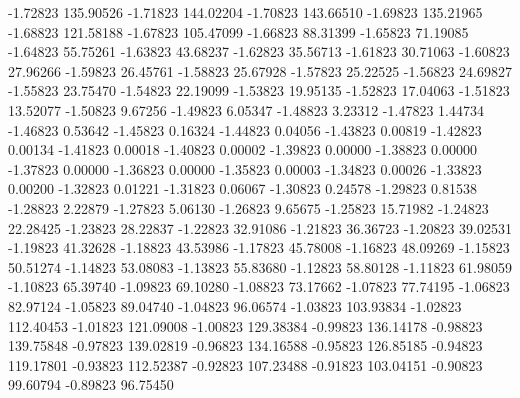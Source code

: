      -1.72823    135.90526    
     -1.71823    144.02204    
     -1.70823    143.66510    
     -1.69823    135.21965    
     -1.68823    121.58188    
     -1.67823    105.47099    
     -1.66823     88.31399    
     -1.65823     71.19085    
     -1.64823     55.75261    
     -1.63823     43.68237    
     -1.62823     35.56713    
     -1.61823     30.71063    
     -1.60823     27.96266    
     -1.59823     26.45761    
     -1.58823     25.67928    
     -1.57823     25.22525    
     -1.56823     24.69827    
     -1.55823     23.75470    
     -1.54823     22.19099    
     -1.53823     19.95135    
     -1.52823     17.04063    
     -1.51823     13.52077    
     -1.50823      9.67256    
     -1.49823      6.05347    
     -1.48823      3.23312    
     -1.47823      1.44734    
     -1.46823      0.53642    
     -1.45823      0.16324    
     -1.44823      0.04056    
     -1.43823      0.00819    
     -1.42823      0.00134    
     -1.41823      0.00018    
     -1.40823      0.00002    
     -1.39823      0.00000    
     -1.38823      0.00000    
     -1.37823      0.00000    
     -1.36823      0.00000    
     -1.35823      0.00003    
     -1.34823      0.00026    
     -1.33823      0.00200    
     -1.32823      0.01221    
     -1.31823      0.06067    
     -1.30823      0.24578    
     -1.29823      0.81538    
     -1.28823      2.22879    
     -1.27823      5.06130    
     -1.26823      9.65675    
     -1.25823     15.71982    
     -1.24823     22.28425    
     -1.23823     28.22837    
     -1.22823     32.91086    
     -1.21823     36.36723    
     -1.20823     39.02531    
     -1.19823     41.32628    
     -1.18823     43.53986    
     -1.17823     45.78008    
     -1.16823     48.09269    
     -1.15823     50.51274    
     -1.14823     53.08083    
     -1.13823     55.83680    
     -1.12823     58.80128    
     -1.11823     61.98059    
     -1.10823     65.39740    
     -1.09823     69.10280    
     -1.08823     73.17662    
     -1.07823     77.74195    
     -1.06823     82.97124    
     -1.05823     89.04740    
     -1.04823     96.06574    
     -1.03823    103.93834    
     -1.02823    112.40453    
     -1.01823    121.09008    
     -1.00823    129.38384    
     -0.99823    136.14178    
     -0.98823    139.75848    
     -0.97823    139.02819    
     -0.96823    134.16588    
     -0.95823    126.85185    
     -0.94823    119.17801    
     -0.93823    112.52387    
     -0.92823    107.23488    
     -0.91823    103.04151    
     -0.90823     99.60794    
     -0.89823     96.75450    
